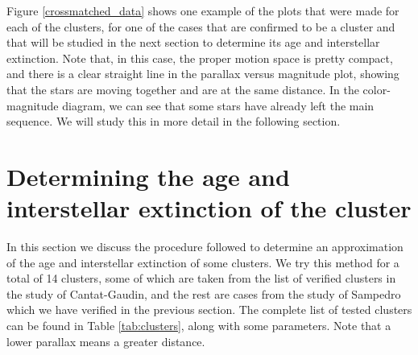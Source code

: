 \documentclass[twocolumn]{revtex4}
\begin{document}
Figure \ref{crossmatched_data} shows one example of the plots that were made for each of the clusters, for one of the cases that are confirmed to be a cluster and that will be studied in the next section to determine its age and interstellar extinction. Note that, in this case, the proper motion space is pretty compact, and there is a clear straight line in the parallax versus magnitude plot, showing that the stars are moving together and are at the same distance. In the color-magnitude diagram, we can see that some stars have already left the main sequence. We will study this in more detail in the following section.


\section{Determining the age and interstellar extinction of the cluster}
In this section we discuss the procedure followed to determine an approximation of the age and interstellar extinction of some clusters. We try this method for a total of 14 clusters, some of which are taken from the list of verified clusters in the study of Cantat-Gaudin, and the rest are cases from the study of Sampedro which we have verified in the previous section. The complete list of tested clusters can be found in Table \ref{tab:clusters}, along with some parameters.
Note that a lower parallax means a greater distance.
\end{document}
